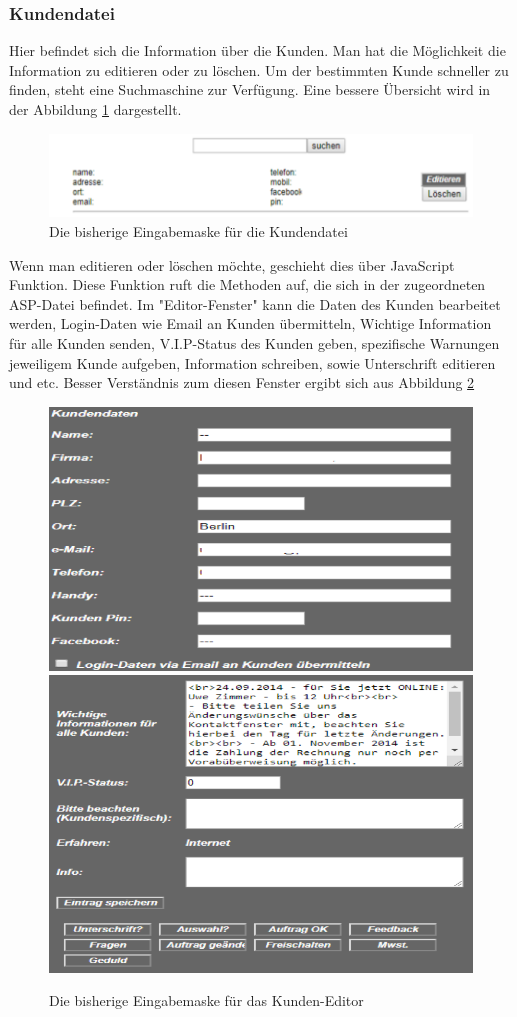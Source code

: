 \pagebreak
\subsubsection{Kundendatei}

Hier befindet sich die Information über die Kunden. Man hat die Möglichkeit die Information zu editieren oder zu löschen. Um der bestimmten Kunde schneller zu finden, steht eine Suchmaschine zur Verfügung. Eine bessere Übersicht wird in der Abbildung \ref{fig:KundenDatei} dargestellt. 

\begin{figure}[h]
	\centering
	\includegraphics[width=0.7\linewidth]{Graphics/kundenDatei.png}
	\caption[Kundeansicht]{Die bisherige Eingabemaske für die Kundendatei}
	\label{fig:KundenDatei}
\end{figure}

Wenn man editieren oder löschen möchte, geschieht dies über JavaScript Funktion. Diese Funktion ruft die Methoden auf, die sich in der zugeordneten ASP-Datei befindet. Im "Editor-Fenster" kann die Daten des Kunden bearbeitet werden, Login-Daten wie Email an Kunden übermitteln, Wichtige Information für alle Kunden senden, V.I.P-Status des Kunden geben, spezifische Warnungen jeweiligem Kunde aufgeben, Information schreiben, sowie Unterschrift editieren und etc. Besser Verständnis zum diesen Fenster ergibt sich aus Abbildung \ref{fig:KundenEditor}


\pagebreak

\begin{figure}[h]
	\centering
	\includegraphics[width=0.7\linewidth]{Graphics/kundeEditieren.png}
	\includegraphics[width=0.7\linewidth]{Graphics/kundeEditieren1.png}
	\caption[Kundeansicht]{Die bisherige Eingabemaske für das Kunden-Editor}
	\label{fig:KundenEditor}
\end{figure}


